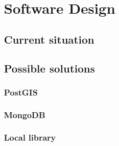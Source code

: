 
\chapter{Software Design}



\section{Current situation}



\section{Possible solutions}


\subsection{PostGIS}


\subsection{MongoDB}


\subsection{Local library}
